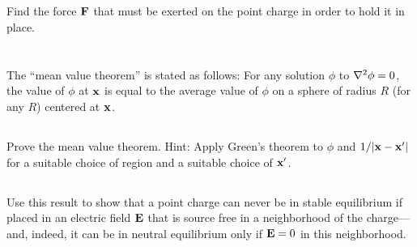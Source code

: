 \documentclass[11pt]{article}
\newenvironment{statement}[1]
{
	\section{#1}
	\color{darkgray}
	\ignorespaces
}
{
}
\newenvironment{problem}
{
	\subsection{}
	\color{darkgray}
    \ignorespaces
}
{

}
\begin{document}
\begin{problem}
	Find the force $\mathbf{F}$ that must be exerted on the point charge in order to hold it in place.
\end{problem}




\begin{statement}{}
	The ``mean value theorem'' is stated as follows: For any solution $\phi$ to $\nabla^2 \phi = 0$, the value of $\phi$ at $\mathbf{x}$ is equal to the average value of $\phi$ on a sphere of radius $R$ (for any $R$) centered at $\mathbf{x}$.
\end{statement}

\begin{problem}
	Prove the mean value theorem.  Hint: Apply Green's theorem to $\phi$ and $1/\abs{\mathbf{x} - \mathbf{x}'}$ for a suitable choice of region and a suitable choice of $\mathbf{x}'$.
\end{problem}

\begin{problem}
	Use this result to show that a point charge can never be in stable equilibrium if placed in an electric field $\mathbf{E}$ that is source free in a neighborhood of the charge---and, indeed, it can be in neutral equilibrium only if $\mathbf{E} = 0$ in this neighborhood.
\end{problem}

\end{document}
